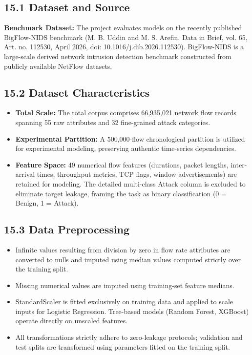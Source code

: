 
\subsection{15.1 Dataset and Source}

\textbf{Benchmark Dataset:} The project evaluates models on the recently published BigFlow-NIDS benchmark (M. B. Uddin and M. S. Arefin, Data in Brief, vol. 65, Art. no. 112530, April 2026, doi: 10.1016/j.dib.2026.112530). BigFlow-NIDS is a large-scale derived network intrusion detection benchmark constructed from publicly available NetFlow datasets.

\subsection{15.2 Dataset Characteristics}

\begin{itemize}
\item \textbf{Total Scale:} The total corpus comprises 66,935,021 network flow records spanning 55 raw attributes and 32 fine-grained attack categories.
\item \textbf{Experimental Partition:} A 500,000-flow chronological partition is utilized for experimental modeling, preserving authentic time-series dependencies.
\item \textbf{Feature Space:} 49 numerical flow features (durations, packet lengths, inter-arrival times, throughput metrics, TCP flags, window advertisements) are retained for modeling. The detailed multi-class Attack column is excluded to eliminate target leakage, framing the task as binary classification (0 = Benign, 1 = Attack).
\end{itemize}

\subsection{15.3 Data Preprocessing}

\begin{itemize}
\item Infinite values resulting from division by zero in flow rate attributes are converted to nulls and imputed using median values computed strictly over the training split.
\item Missing numerical values are imputed using training-set feature medians.
\item StandardScaler is fitted exclusively on training data and applied to scale inputs for Logistic Regression. Tree-based models (Random Forest, XGBoost) operate directly on unscaled features.
\item All transformations strictly adhere to zero-leakage protocols; validation and test splits are transformed using parameters fitted on the training split.
\end{itemize}

